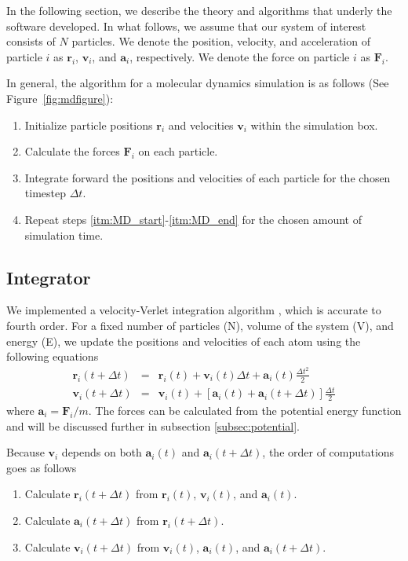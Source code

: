 \documentclass[12pt]{article}
\begin{document}
In the following section, we describe the theory and algorithms that underly the software developed.
%
In what follows, we assume that our system of interest consists of $N$ particles.
%
We denote the position, velocity, and acceleration of particle $i$ as $\mathbf{r}_i$, $\mathbf{v}_i$, and $\mathbf{a}_i$, respectively.
%
We denote the force on particle $i$ as $\mathbf{F}_i$.

In general, the algorithm for a molecular dynamics simulation is as follows (See Figure~\ref{fig:mdfigure}):
\begin{enumerate}
\item Initialize particle positions $\mathbf{r}_i$ and velocities $\mathbf{v}_i$ within the simulation box.
\item  \label{itm:MD_start} Calculate the forces $\mathbf{F}_i$ on each particle.
\item \label{itm:MD_end} Integrate forward the positions and velocities of each particle for the chosen timestep $\Delta t$.
\item Repeat steps \ref{itm:MD_start}-\ref{itm:MD_end} for the chosen amount of simulation time.
\end{enumerate}

\subsection{Integrator} \label{subsec:integrator}

We implemented a velocity-Verlet integration algorithm \cite{Swope1982}, which is accurate to fourth order.
%
For a fixed number of particles (N), volume of the system (V), and energy (E), we update the positions and velocities of each atom using the following equations
\begin{eqnarray}
\mathbf{r}_i (t + \Delta t)  & = & \mathbf{r}_i(t) + \mathbf{v}_i(t) \Delta t + \mathbf{a}_i(t) \frac{\Delta t^2}{2} \\
\mathbf{v}_i(t + \Delta t) & = & \mathbf{v}_i(t) + \left[\mathbf{a}_i(t) + \mathbf{a}_i(t + \Delta t) \right] \frac{\Delta t}{2}
\end{eqnarray}
where $\mathbf{a}_i = \mathbf{F}_i/m$.
%
The forces can be calculated from the potential energy function and will be discussed further in subsection \ref{subsec:potential}.

Because $\mathbf{v}_i$ depends on both $\mathbf{a}_i(t)$ and $\mathbf{a}_i(t+\Delta t)$, the order of computations goes as follows
\begin{enumerate}
\item Calculate $\mathbf{r}_i(t + \Delta t)$ from $\mathbf{r}_i(t)$, $\mathbf{v}_i(t)$, and $\mathbf{a}_i(t)$.
\item Calculate $\mathbf{a}_i(t + \Delta t)$ from $\mathbf{r}_i(t + \Delta t)$.
\item Calculate $\mathbf{v}_i(t + \Delta t)$ from $\mathbf{v}_i(t)$, $\mathbf{a}_i(t)$, and $\mathbf{a}_i(t + \Delta t)$.
\end{enumerate}
\end{document}
